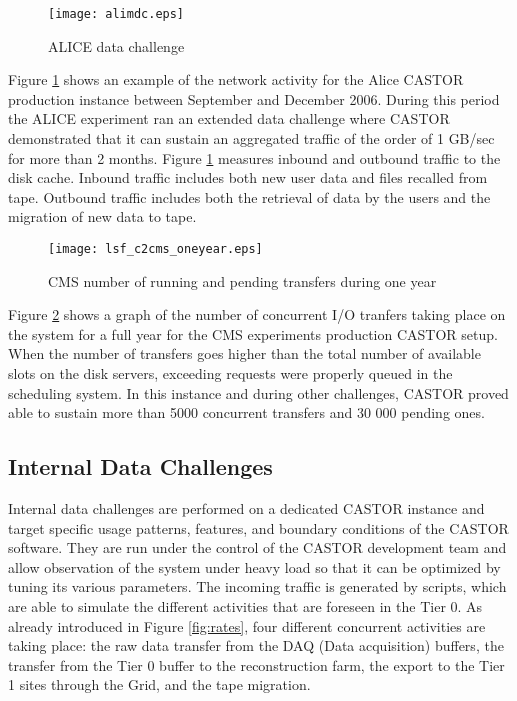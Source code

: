 \begin{figure}[htbp]
\centering
\texttt{[image: alimdc.eps]}
\caption{ALICE data challenge}
\label{fig:alicedc}
\end{figure}

Figure \ref{fig:alicedc} shows an example of the network activity for the Alice
CASTOR production instance between September and December 2006.
During this period the ALICE experiment ran an extended
data challenge where CASTOR demonstrated that it can sustain an aggregated
traffic of the order of 1 GB/sec for more than 2 months.
Figure \ref{fig:alicedc} measures inbound and outbound traffic to the disk cache.
Inbound traffic includes both
new user data and files recalled from tape. Outbound traffic includes both
the retrieval of data by the users and the migration of new data to tape.

\begin{figure}[htbp]
\centering
\texttt{[image: lsf\_c2cms\_oneyear.eps]}
\caption{CMS number of running and pending transfers during one year}
\label{fig:cmsNbJobs}
\end{figure}

Figure \ref{fig:cmsNbJobs} shows a graph of the number of concurrent I/O
tranfers taking place on the system for a full year for the CMS experiments
production CASTOR setup. When the number of transfers goes higher than the
total number of available slots on the disk servers, exceeding requests were
properly queued in the scheduling system. In this instance and during other
challenges, CASTOR proved able to sustain more than 5000 concurrent transfers and
30 000 pending ones.

\subsection{Internal Data Challenges}

Internal data challenges are performed on a dedicated CASTOR instance
and target specific usage patterns, features, and boundary conditions
of the CASTOR software. They are run under the control of the CASTOR
development team and allow observation of the system under
heavy load so that it can be optimized by tuning its various parameters.
The incoming traffic is generated by scripts, which are able to simulate
the different activities that are foreseen in the Tier 0.
As already introduced in Figure \ref{fig:rates},
four different concurrent activities are taking place:
the raw data transfer from the DAQ (Data acquisition)
buffers, the transfer from the Tier 0 buffer to the reconstruction
farm, the export to the Tier 1 sites through the Grid, and the tape migration.

